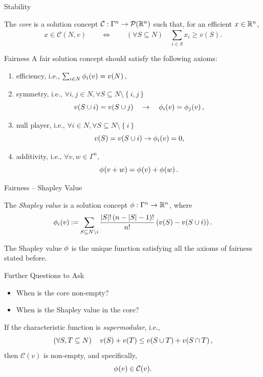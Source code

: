 \documentclass[]{beamer}
\begin{document}
\begin{frame}{Stability}
	\begin{definition}[Core]
		The \emph{core} is a solution concept $ \mathcal{C}: \Gamma^n \to \pot {\R^n} $ such that, for an efficient $ x \in \R^n $, \[
			x \in \mathcal{C}(N,v) \qquad \iff \qquad \left( \forall S \subseteq N \right)\quad \sum_{i \in S}^{} x_i \geq v(S).
		\]
	\end{definition}
\end{frame}

\begin{frame}{Fairness}
	A fair solution concept should satisfy the following axioms:
	\begin{enumerate}
		\item efficiency, i.e., $\sum_{i \in N}^{} \shapley[i]{v} = \fce{v}{N},$
		\item symmetry, i.e., $  \forall i,j \in N, \forall S \subseteq N \setminus \left\{ i,j \right\} $\[
				 \fce{v}{S \cup i} = \fce{v}{S \cup j} \quad\implies\quad \shapley[i]{v} = \shapley[j]{v} ,
			\]
		\item null player, i.e., $ \forall i \in N, \forall S \subseteq N \setminus \left\{ i \right\} $
			\[
				\fce{v}{S} = \fce{v}{S \cup i} \implies \shapley[i]{v} = 0,
			\]
		\item additivity, i.e., $ \forall v,w \in \Gamma^ n, $
			\[
				\shapley{v + w} = \shapley{v} + \shapley{w}.
			\]
	\end{enumerate}
\end{frame}

\begin{frame}{Fairness -- Shapley Value}
	\begin{definition}
		The \emph{Shapley value} is a solution concept $ \Shapley: \Gamma^n \to \R^n $, where \[
			\shapley[i]v \deq \sum_{S \subseteq N \setminus i}^{} \frac{\absolute S! \left( n-\absolute S-1 \right)!}{n!} \left( \fce{v}{S} - \fce{v}{S \cup i} \right).
		\]
	\end{definition}

	\begin{theorem}[Shapley]
		The Shapley value $ \Shapley $ is the unique function satisfying all the axioms of fairness stated before.
	\end{theorem}
\end{frame}

\begin{frame}{Further Questions to Ask}
	\begin{itemize}[ ]
		\item When is the core non-empty?
		\item When is the Shapley value in the core?
	\end{itemize}
	\vspace{1em}
	\begin{theorem}
		If the characteristic function is \emph{supermodular}, i.e., \[
			\left( \forall S,T \subseteq N \right)\quad \fce{v}{S} + \fce{v}{T} \leq \fce{v}{S \cup T} + \fce{v}{S \cap T},
		\]
		then $ \mathcal{C}(v) $ is non-empty, and specifically, \[
			\shapley v \in \mathcal{C}(v).
		\]
	\end{theorem}
\end{frame}
\end{document}
